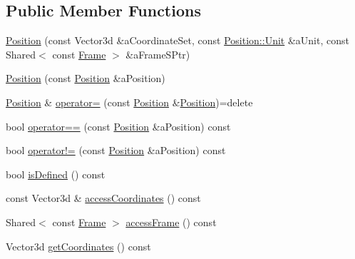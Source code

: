 \subsection*{Public Member Functions}
\begin{DoxyCompactItemize}
\item 
\hyperlink{classlibrary_1_1physics_1_1coord_1_1_position_ac69f2ea85b82a43db1793f7e9cb183f8}{Position} (const Vector3d \&a\+Coordinate\+Set, const \hyperlink{classlibrary_1_1physics_1_1units_1_1_length_a3b8b39cd245cf6b19dc34459baeccb18}{Position\+::\+Unit} \&a\+Unit, const Shared$<$ const \hyperlink{classlibrary_1_1physics_1_1coord_1_1_frame}{Frame} $>$ \&a\+Frame\+S\+Ptr)
\item 
\hyperlink{classlibrary_1_1physics_1_1coord_1_1_position_a8916e7e373ca3f2bd44d7b41b7f2c2aa}{Position} (const \hyperlink{classlibrary_1_1physics_1_1coord_1_1_position}{Position} \&a\+Position)
\item 
\hyperlink{classlibrary_1_1physics_1_1coord_1_1_position}{Position} \& \hyperlink{classlibrary_1_1physics_1_1coord_1_1_position_a5efd032c43ad551922c7ffcd71961090}{operator=} (const \hyperlink{classlibrary_1_1physics_1_1coord_1_1_position}{Position} \&\hyperlink{classlibrary_1_1physics_1_1coord_1_1_position}{Position})=delete
\item 
bool \hyperlink{classlibrary_1_1physics_1_1coord_1_1_position_a520bfdf64e8f45f60e815ebc72012fde}{operator==} (const \hyperlink{classlibrary_1_1physics_1_1coord_1_1_position}{Position} \&a\+Position) const
\item 
bool \hyperlink{classlibrary_1_1physics_1_1coord_1_1_position_a78524e4b9328853ca6266defbe61fc7e}{operator!=} (const \hyperlink{classlibrary_1_1physics_1_1coord_1_1_position}{Position} \&a\+Position) const
\item 
bool \hyperlink{classlibrary_1_1physics_1_1coord_1_1_position_ac13492ffe13b093bb26173089db1a24b}{is\+Defined} () const
\item 
const Vector3d \& \hyperlink{classlibrary_1_1physics_1_1coord_1_1_position_abbcef57299f3416b88c458ea6bcd24e5}{access\+Coordinates} () const
\item 
Shared$<$ const \hyperlink{classlibrary_1_1physics_1_1coord_1_1_frame}{Frame} $>$ \hyperlink{classlibrary_1_1physics_1_1coord_1_1_position_a26c1f0eba51a3441106367eac1827455}{access\+Frame} () const
\item 
Vector3d \hyperlink{classlibrary_1_1physics_1_1coord_1_1_position_a35981f1150639afac722ccf13bf2f4bd}{get\+Coordinates} () const
\item 

\end{DoxyCompactItemize}
